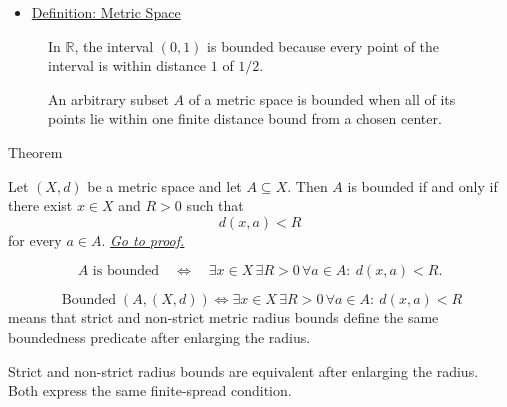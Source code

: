 \begin{dependencies}
\begin{itemize}
  \item \hyperref[def:metric-space]{Definition: Metric Space}
\end{itemize}
\end{dependencies}

\begin{figure}[htbp]
\centering

\caption{In \(\mathbb{R}\), the interval \((0,1)\) is bounded because every
point of the interval is within distance \(1\) of \(1/2\).}
\label{fig:bounded-interval-r}
\end{figure}

\begin{figure}[htbp]
\centering

\caption{An arbitrary subset \(A\) of a metric space is bounded when all of
its points lie within one finite distance bound from a chosen center.}
\label{fig:bounded-arbitrary-set}
\end{figure}

\begin{theorembox}{Theorem}
\begin{theorem}
\label{thm:metric-equivalent-boundedness-criterion}
Let \((X,d)\) be a metric space and let \(A\subseteq X\).  Then \(A\) is
bounded if and only if there exist \(x\in X\) and \(R>0\) such that
\[
  d(x,a)<R
\]
for every \(a\in A\).
\hyperref[prf:metric-equivalent-boundedness-criterion]{\textit{Go to proof.}}
\end{theorem}
\end{theorembox}

\begin{remark*}
\[
A\text{ is bounded}
\quad\Longleftrightarrow\quad
\exists x\in X\,\exists R>0\,\forall a\in A{:}\ d(x,a)<R.
\]
\end{remark*}

\begin{remark*}
\[
\operatorname{Bounded}(A,(X,d))
\Longleftrightarrow
\exists x\in X\,\exists R>0\,\forall a\in A{:}\ d(x,a)<R
\]
means that strict and non-strict metric radius bounds define the same
boundedness predicate after enlarging the radius.
\end{remark*}

\begin{remark*}[Interpretation]
Strict and non-strict radius bounds are equivalent after enlarging the radius.
Both express the same finite-spread condition.
\end{remark*}

